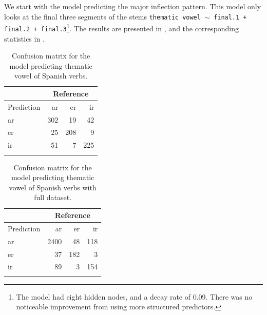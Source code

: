 We start with the model predicting the major inflection pattern. This model only looks at the final three segments of the stems \texttt{thematic vowel $\sim$ final.1 + final.2 + final.3}\footnote{The model had eight hidden nodes, and a decay rate of 0.09. There was no noticeable improvement from using more structured predictors.}. The results are presented in , and the corresponding statistics in .


    
\begin{table}
    
    \begin{tabular}{lrrr}
      \lsptoprule
      & \multicolumn{3}{c}{Reference} \\
      \midrule
      Prediction & ar  & er  & ir                \\
      ar         & 302 & 19  & 42                \\
      er         & 25  & 208 & 9                 \\
      ir         & 51  & 7   & 225               \\
      \lspbottomrule
    \end{tabular}
    \caption{Confusion matrix for the model predicting thematic vowel of Spanish verbs.}
    \label{tab:spanish-verbs-theme-v}
\end{table}

\begin{table}

    
    \begin{tabular}{lrrr}
      \lsptoprule
      & \multicolumn{3}{c}{Reference} \\
      \midrule
      Prediction & ar   & er  & ir               \\
      ar         & 2400 & 48  & 118              \\
      er         & 37   & 182 & 3                \\
      ir         & 89   & 3   & 154              \\
      \lspbottomrule
    \end{tabular}
    \caption{Confusion matrix for the model predicting thematic vowel of Spanish verbs with full dataset.}
    \label{tab:spanish-verbs-theme-v-2}
\end{table}


